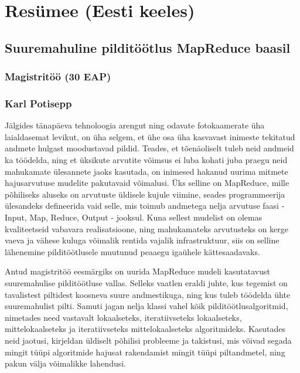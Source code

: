\documentclass [12pt,a4paper]{report}
\begin{document}
\listoffigures
\listofalgorithms


\chapter*{Resümee (Eesti keeles)}

\section*{Suuremahuline pilditöötlus MapReduce baasil}
\subsection*{Magistritöö (30 EAP)}
\subsection*{Karl Potisepp}

Jälgides tänapäeva tehnoloogia arengut ning odavate fotokaamerate üha laialdasemat levikut, on üha selgem, et ühe osa üha kasvavast inimeste tekitatud andmete hulgast moodustavad pildid. Teades, et tõenäoliselt tuleb neid andmeid ka töödelda, ning et üksikute arvutite võimsus ei luba kohati juba praegu neid mahukamate ülesannete jaoks kasutada, on inimesed hakanud uurima mitmete hajusarvutuse mudelite pakutavaid võimalusi. Üks selline on MapReduce, mille põhiliseks aluseks on arvutuste üldisele kujule viimine, seades programmeerija ülesandeks defineerida vaid selle, mis toimub andmetega nelja arvutuse faasi - Input, Map, Reduce, Output - jooksul. Kuna sellest mudelist on olemas kvaliteetseid vabavara realisatsioone, ning mahukamateks arvutusteks on kerge vaeva ja vähese kuluga võimalik rentida vajalik infrastruktuur, siis on selline lähenemine pilditöötlusele muutunud peaaegu igaühele kättesaadavaks.

Antud magistritöö eesmärgiks on uurida MapReduce mudeli kasutatavust suuremahulise pilditöötluse vallas. Selleks vaatlen eraldi juhte, kus tegemist on tavalistest piltidest koosneva suure andmestikuga, ning kus tuleb töödelda ühte suuremahulist pilti. Samuti jagan nelja klassi vahel kõik pilditöötlusalgoritmid, nimetades need vastavalt lokaalseteks, iteratiivseteks lokaalseteks, mittelokaalseteks ja iteratiivseteks mittelokaalseteks algoritmideks. Kasutades neid jaotusi, kirjeldan üldiselt põhilisi probleeme ja takistusi, mis võivad segada mingit tüüpi algoritmide hajusat rakendamist
mingit tüüpi piltandmetel, ning pakun välja võimalikke lahendusi.
\end{document}
